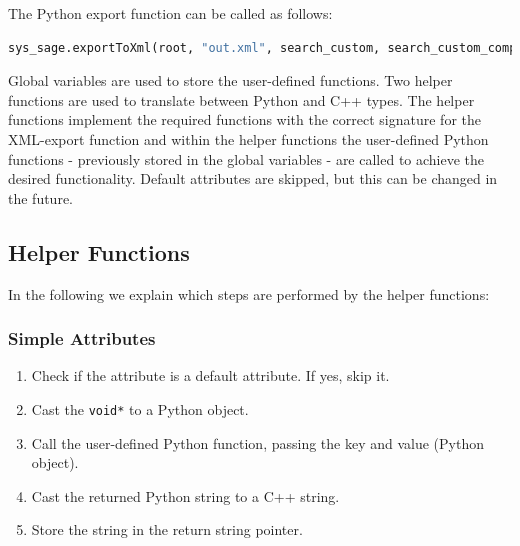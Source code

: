 The Python export function can be called as follows:

\begin{lstlisting}[language=Python, xleftmargin=4em, frame = single]
sys_sage.exportToXml(root, "out.xml", search_custom, search_custom_complex)
\end{lstlisting}



Global variables are used to store the user-defined functions. Two helper functions are used to translate between Python and C++ types. The helper functions implement the required functions with the correct signature for the XML-export function and within the helper functions the user-defined Python functions - previously stored in the global variables - are called to achieve the desired functionality. Default attributes are skipped, but this can be changed in the future.

\subsection{Helper Functions}

In the following we explain which steps are performed by the helper functions:

\subsubsection{Simple Attributes}
\begin{enumerate}
\item Check if the attribute is a default attribute. If yes, skip it.
\item Cast the \verb|void*| to a Python object.
\item Call the user-defined Python function, passing the key and value (Python object).
\item Cast the returned Python string to a C++ string.
\item Store the string in the return string pointer.
\end{enumerate}


